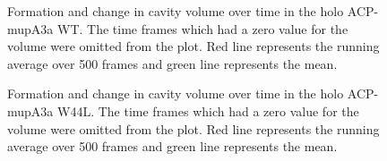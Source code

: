 \begin{singlespacing}
		\setlength\fboxsep{5pt}
		\setlength\fboxrule{1.5pt}
		\begin{figure}[htbp]
		\centering
		\caption[Formation and change in cavity volume over time in the holo ACP-mupA3a WT.]{Formation and change in cavity volume over time in the holo ACP-mupA3a WT. The time frames which had a zero value for the volume were omitted from the plot. Red line represents the running average over 500 frames and green line represents the mean.}
		\label{fig:CavityVolumeACPPPTWild_nonzero}
		\end{figure}

		\setlength\fboxsep{5pt}
		\setlength\fboxrule{1.5pt}
		\begin{figure}[htbp]
		\centering
		\caption[Formation and change in cavity volume over time in the holo ACP-mupA3a W44L.]{Formation and change in cavity volume over time in the holo ACP-mupA3a W44L. The time frames which had a zero value for the volume were omitted from the plot. Red line represents the running average over 500 frames and green line represents the mean.}
		\label{fig:CavityVolumeACPPPMutant_nonzero}
		\end{figure}	


\end{singlespacing}
